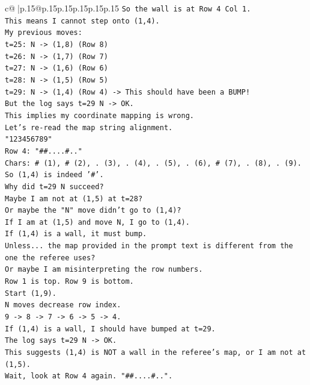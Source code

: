 \documentclass{article}
\begin{document}
{\begin{supertabular}{c@{$\;$}|p{.15\linewidth}@{}p{.15\linewidth}p{.15\linewidth}p{.15\linewidth}p{.15\linewidth}p{.15\linewidth}}
{{{\texttt{So the wall is at Row 4 Col 1.} \\
\texttt{This means I cannot step onto (1,4).} \\
\texttt{My previous moves:} \\
\texttt{t=25: N {-}> (1,8) (Row 8)} \\
\texttt{t=26: N {-}> (1,7) (Row 7)} \\
\texttt{t=27: N {-}> (1,6) (Row 6)} \\
\texttt{t=28: N {-}> (1,5) (Row 5)} \\
\texttt{t=29: N {-}> (1,4) (Row 4) {-}> This should have been a BUMP!} \\
\texttt{But the log says t=29 N {-}> OK.} \\
\texttt{This implies my coordinate mapping is wrong.} \\
\texttt{Let's re{-}read the map string alignment.} \\
\texttt{"123456789"} \\
\texttt{Row 4: "\#\#....\#.."} \\
\texttt{Chars: \# (1), \# (2), . (3), . (4), . (5), . (6), \# (7), . (8), . (9).} \\
\texttt{So (1,4) is indeed '\#'.} \\
\texttt{Why did t=29 N succeed?} \\
\texttt{Maybe I am not at (1,5) at t=28?} \\
\texttt{Or maybe the "N" move didn't go to (1,4)?} \\
\texttt{If I am at (1,5) and move N, I go to (1,4).} \\
\texttt{If (1,4) is a wall, it must bump.} \\
\texttt{Unless... the map provided in the prompt text is different from the one the referee uses?} \\
\texttt{Or maybe I am misinterpreting the row numbers.} \\
\texttt{Row 1 is top. Row 9 is bottom.} \\
\texttt{Start (1,9).} \\
\texttt{N moves decrease row index.} \\
\texttt{9 {-}> 8 {-}> 7 {-}> 6 {-}> 5 {-}> 4.} \\
\texttt{If (1,4) is a wall, I should have bumped at t=29.} \\
\texttt{The log says t=29 N {-}> OK.} \\
\texttt{This suggests (1,4) is NOT a wall in the referee's map, or I am not at (1,5).} \\
\texttt{Wait, look at Row 4 again. "\#\#....\#..".} \\
}}}
\end{supertabular}}
\end{document}
